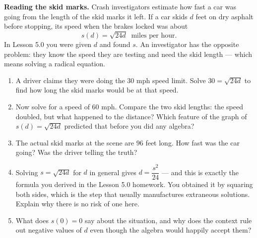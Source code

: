 \documentclass[10pt]{article}
\begin{document}
\begin{extensionbox}
\textbf{Reading the skid marks.} Crash investigators estimate how fast a car was going from the
length of the skid marks it left. If a car skids $d$ feet on dry asphalt before stopping, its speed
when the brakes locked was about
\[
  s(d)=\sqrt{24d} \ \text{ miles per hour.}
\]
In Lesson 5.0 you were given $d$ and found $s$. An investigator has the opposite problem: they know
the speed they are testing and need the skid length --- which means solving a radical equation.
\begin{enumerate}[label=(\alph*), leftmargin=1.8em, itemsep=5pt]
  \item A driver claims they were doing the $30$ mph speed limit. Solve $30=\sqrt{24d}$ to find how
        long the skid marks would be at that speed.
  \item Now solve for a speed of $60$ mph. Compare the two skid lengths: the speed doubled, but what
        happened to the distance? Which feature of the graph of $s(d)=\sqrt{24d}$ predicted that
        before you did any algebra?
  \item The actual skid marks at the scene are $96$ feet long. How fast was the car going? Was the
        driver telling the truth?
  \item Solving $s=\sqrt{24d}$ for $d$ in general gives $d=\dfrac{s^{2}}{24}$ --- and this is exactly
        the formula you derived in the Lesson 5.0 homework. You obtained it by squaring both sides,
        which is the step that usually manufactures extraneous solutions. Explain why there is no
        risk of one here.
  \item What does $s(0)=0$ say about the situation, and why does the context rule out negative
        values of $d$ even though the algebra would happily accept them?
\end{enumerate}
\end{extensionbox}
\end{document}
